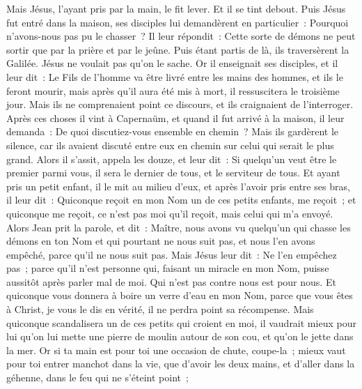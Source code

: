 \begin{multicols}{2}
Mais Jésus, l'ayant pris par la main, le fit lever. Et il se tint debout.
Puis Jésus fut entré dans la maison, ses disciples lui demandèrent en particulier~: Pourquoi n'avons-nous pas pu le chasser~?
Il leur répondit~: Cette sorte de démons ne peut sortir que par la prière et par le jeûne.
Puis étant partis de là, ils traversèrent la Galilée. Jésus ne voulait pas qu'on le sache.
Or il enseignait ses disciples, et il leur dit~: Le Fils de l'homme va être livré entre les mains des hommes, et ils le feront mourir, mais après qu'il aura été mis à mort, il ressuscitera le troisième jour.
Mais ils ne comprenaient point ce discours, et ils craignaient de l'interroger.
Après ces choses il vint à Capernaüm, et quand il fut arrivé à la maison, il leur demanda~: De quoi discutiez-vous ensemble en chemin~?
Mais ils gardèrent le silence, car ils avaient discuté entre eux en chemin sur celui qui serait le plus grand.
Alors il s'assit, appela les douze, et leur dit~: Si quelqu'un veut être le premier parmi vous, il sera le dernier de tous, et le serviteur de tous.
Et ayant pris un petit enfant, il le mit au milieu d'eux, et après l'avoir pris entre ses bras, il leur dit~:
Quiconque reçoit en mon Nom un de ces petits enfants, me reçoit~; et quiconque me reçoit, ce n'est pas moi qu'il reçoit, mais celui qui m'a envoyé.
Alors Jean prit la parole, et dit~: Maître, nous avons vu quelqu'un qui chasse les démons en ton Nom et qui pourtant ne nous suit pas, et nous l'en avons empêché, parce qu'il ne nous suit pas.
Mais Jésus leur dit~: Ne l'en empêchez pas~; parce qu'il n'est personne qui, faisant un miracle en mon Nom, puisse aussitôt après parler mal de moi.
Qui n'est pas contre nous est pour nous.
Et quiconque vous donnera à boire un verre d'eau en mon Nom, parce que vous êtes à Christ, je vous le dis en vérité, il ne perdra point sa récompense.
Mais quiconque scandalisera un de ces petits qui croient en moi, il vaudrait mieux pour lui qu'on lui mette une pierre de moulin autour de son cou, et qu'on le jette dans la mer.
Or si ta main est pour toi une occasion de chute, coupe-la~; mieux vaut pour toi entrer manchot dans la vie, que d'avoir les deux mains, et d'aller dans la géhenne, dans le feu qui ne s'éteint point~;

\end{multicols}
